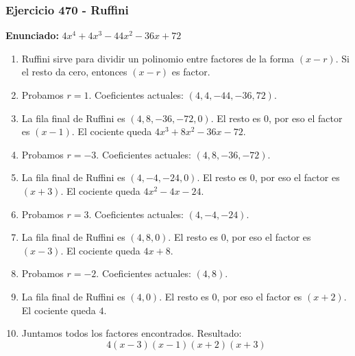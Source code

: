 \documentclass[11pt,a4paper]{article}
\begin{document}
\subsubsection*{Ejercicio 470 - Ruffini}
\textbf{Enunciado:} $ 4 x^{4} + 4 x^{3} - 44 x^{2} - 36 x + 72 $\par
\begin{enumerate}[leftmargin=2em]
\item Ruffini sirve para dividir un polinomio entre factores de la forma \((x-r)\). Si el resto da cero, entonces \((x-r)\) es factor.
\item Probamos \(r=1\). Coeficientes actuales: \((4, 4, -44, -36, 72)\).
\item La fila final de Ruffini es \((4, 8, -36, -72, 0)\). El resto es \(0\), por eso el factor es \((x-1)\). El cociente queda \(4 x^{3} + 8 x^{2} - 36 x - 72\).
\item Probamos \(r=-3\). Coeficientes actuales: \((4, 8, -36, -72)\).
\item La fila final de Ruffini es \((4, -4, -24, 0)\). El resto es \(0\), por eso el factor es \((x+3)\). El cociente queda \(4 x^{2} - 4 x - 24\).
\item Probamos \(r=3\). Coeficientes actuales: \((4, -4, -24)\).
\item La fila final de Ruffini es \((4, 8, 0)\). El resto es \(0\), por eso el factor es \((x-3)\). El cociente queda \(4 x + 8\).
\item Probamos \(r=-2\). Coeficientes actuales: \((4, 8)\).
\item La fila final de Ruffini es \((4, 0)\). El resto es \(0\), por eso el factor es \((x+2)\). El cociente queda \(4\).
\item Juntamos todos los factores encontrados. Resultado: \[\boxed{4 \left(x - 3\right) \left(x - 1\right) \left(x + 2\right) \left(x + 3\right)}\]
\end{enumerate}

\vspace{0.2cm}
\end{document}
